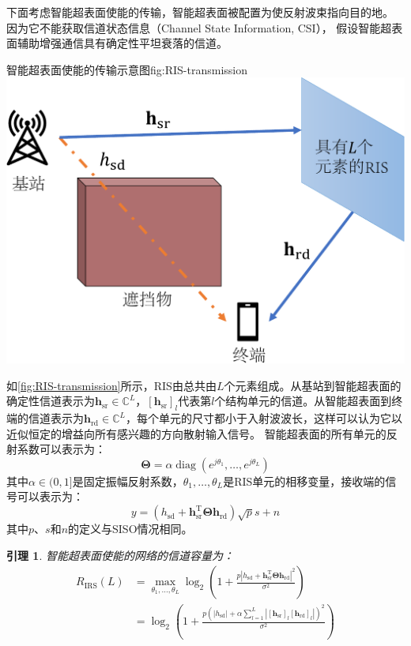 \documentclass[supercite]{HustGraduPaper}
\newtheorem{lemma}{\indent 引理}[section]
\begin{document}
下面考虑智能超表面使能的传输，智能超表面被配置为使反射波束指向目的地。
因为它不能获取信道状态信息（Channel State Information, CSI），
假设智能超表面辅助增强通信具有确定性平坦衰落的信道。

\begin{generalfig}[htb]{智能超表面使能的传输示意图}{fig:RIS-transmission}
	\includegraphics[width=0.6\linewidth]{Figures/RIS-transmission.pdf}
\end{generalfig}

如\autoref{fig:RIS-transmission}所示，RIS由总共由$L$个元素组成。从基站到智能超表面的确定性信道表示为$\mathbf{h}_{\mathrm{sr}} \in \mathbb{C}^{L}$，$\left[\mathbf{h}_{\mathrm{sr}}\right]_{l}$代表第$l$个结构单元的信道。从智能超表面到终端的信道表示为$\mathbf{h}_{\mathrm{rd}} \in \mathbb{C}^{L}$，每个单元的尺寸都小于入射波波长，这样可以认为它以近似恒定的增益向所有感兴趣的方向散射输入信号\cite{emil2019intelligent}。
智能超表面的所有单元的反射系数可以表示为：
\begin{equation}
	\boldsymbol{\Theta}=\alpha \operatorname{diag}\left(e^{j \theta_{1}}, \ldots, e^{j \theta_{L}}\right)
\end{equation}
其中$\alpha \in (0,1]$是固定振幅反射系数，$\theta_{1}, \ldots, \theta_{L}$是RIS单元的相移变量，接收端的信号可以表示为：
\begin{equation}
	y=\left(h_{\mathrm{sd}}+\mathbf{h}_{\mathrm{sr}}^{\mathrm{T}} \boldsymbol{\Theta} \mathbf{h}_{\mathrm{rd}}\right) \sqrt{p} s+n
\end{equation}
其中$p$、$s$和$n$的定义与SISO情况相同。

\begin{lemma}
	智能超表面使能的网络的信道容量为：
	\begin{align}
		R_{\mathrm{IRS}}(L) &=\max _{\theta_{1}, \ldots, \theta_{L}} \log _{2}\left(1+\frac{p\left|h_{\mathrm{sd}}+\mathbf{h}_{\mathrm{sr}}^{\mathrm{T}} \boldsymbol{\Theta} \mathbf{h}_{\mathrm{rd}}\right|^{2}}{\sigma^{2}}\right) \label{eq:R-RIS1} \\
		&=\log _{2}\left(1+\frac{p\left(\left|h_{\mathrm{sd}}\right|+\alpha \sum_{l=1}^{L}\left|\left[\mathbf{h}_{\mathrm{sr}}\right]_{l}\left[\mathbf{h}_{\mathrm{rd}}\right]_{l}\right|\right)^{2}}{\sigma^{2}}\right)
	\end{align}
\end{lemma}
\end{document}
